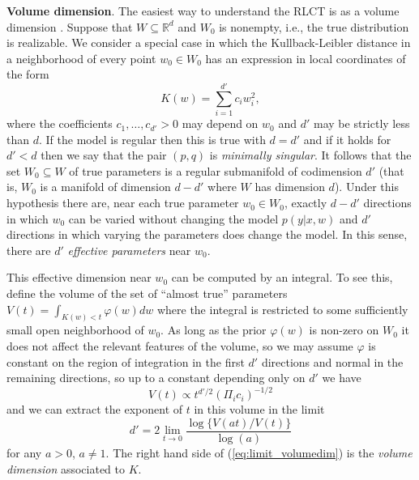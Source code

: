 \documentclass{article} %
\def\be{\begin{equation}}
\def\ee{\end{equation}}
\begin{document}
\textbf{Volume dimension}. The easiest way to understand the RLCT is as a volume dimension \citep[Theorem 7.1]{watanabe_algebraic_2009}.  Suppose that $W \subseteq \mathbb{R}^d$ and $W_0$ is nonempty, i.e., the true distribution is realizable. We consider a special case in which the Kullback-Leibler distance in a neighborhood of every point $w_0 \in W_0$ has an expression in local coordinates of the form
\begin{equation}\label{eq:local_Kw}
K(w) = \sum_{i=1}^{d'} c_i w_i^2,
\end{equation} %
where the coefficients $c_1,\ldots,c_{d'} > 0$ may depend on $w_0$ and $d'$ may be strictly less than $d$. If the model is regular then this is true with $d = d'$ and if it holds for $d' < d$ then we say that the pair $(p,q)$ is \emph{minimally singular}. It follows that the set $W_0 \subseteq W$ of true parameters is a regular submanifold of codimension $d'$ (that is, $W_0$ is a manifold of dimension $d - d'$ where $W$ has dimension $d$). Under this hypothesis there are, near each true parameter $w_0 \in W_0$, exactly $d - d'$ directions in which $w_0$ can be varied without changing the model $p(y|x,w)$ and $d'$ directions in which varying the parameters does change the model. In this sense, there are $d'$ \emph{effective parameters} near $w_0$. 

This effective dimension near $w_0$ can be computed by an integral. To see this, define the volume of the set of ``almost true'' parameters
$
V(t) = \int_{K(w) < t} \varphi(w) dw
$
where the integral is restricted to some sufficiently small open neighborhood of $w_0$. As long as the prior $\varphi(w)$ is non-zero on $W_0$ it does not affect the relevant features of the volume, so we may assume $\varphi$ is constant on the region of integration in the first $d'$ directions and normal in the remaining directions, so up to a constant depending only on $d'$ we have
\begin{equation}\label{eq:volume_singular}
V(t) \propto  t^{d'/2} (\Pi_i c_i)^{-1/2} 
\end{equation}
and we can extract the exponent of $t$ in this volume in the limit
\be\label{eq:limit_volumedim}
d' = 2 \lim_{t \to 0} \frac{\log\big\{V(at)/V(t)\big\}}{\log(a)}
\ee
for any $a > 0$, $a \neq 1$. The right hand side of (\ref{eq:limit_volumedim}) is the \emph{volume dimension} associated to $K$. 
\end{document}
